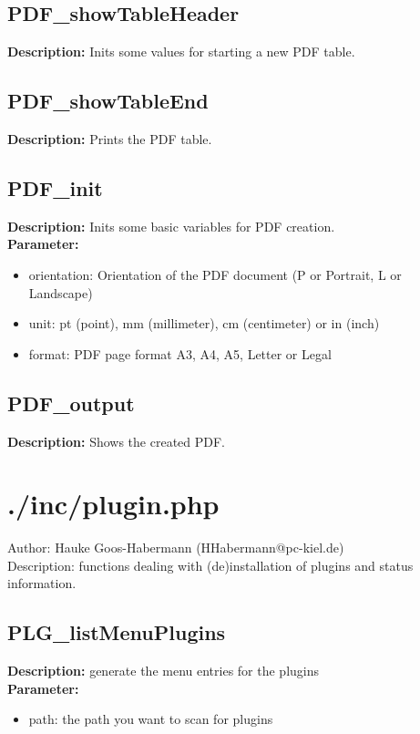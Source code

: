\subsection{PDF\_showTableHeader}
\textbf{Description:} Inits some values for starting a new PDF table.\\

\subsection{PDF\_showTableEnd}
\textbf{Description:} Prints the PDF table.\\

\subsection{PDF\_init}
\textbf{Description:} Inits some basic variables for PDF creation.\\
\textbf{Parameter:}
\begin{itemize}
\item orientation: Orientation of the PDF document (P or Portrait, L or Landscape)
\item unit: pt (point), mm (millimeter), cm (centimeter) or in (inch)
\item format: PDF page format A3, A4, A5, Letter or Legal
\end{itemize}

\subsection{PDF\_output}
\textbf{Description:} Shows the created PDF.\\

\newpage\section{./inc/plugin.php}
 Author: Hauke Goos-Habermann (HHabermann@pc-kiel.de)\\
 Description: functions dealing with (de)installation of plugins and status information.\\

\subsection{PLG\_listMenuPlugins}
\textbf{Description:} generate the menu entries for the plugins\\
\textbf{Parameter:}
\begin{itemize}
\item path: the path you want to scan for plugins
\end{itemize}

